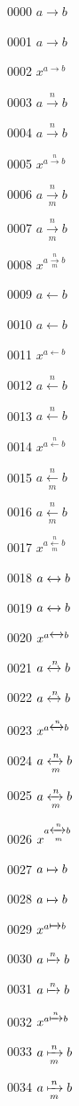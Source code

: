\documentclass{article}
\begin{document}
0000 $a\xrightarrow{}b$\par
0001 $\displaystyle a\xrightarrow{}b$\par
0002 $x^{a\xrightarrow{}b}$\par
0003 $a\xrightarrow{n}b$\par
0004 $\displaystyle a\xrightarrow{n}b$\par
0005 $x^{a\xrightarrow{n}b}$\par
0006 $a\xrightarrow[m]{n}b$\par
0007 $\displaystyle a\xrightarrow[m]{n}b$\par
0008 $x^{a\xrightarrow[m]{n}b}$\par
0009 $a\xleftarrow{}b$\par
0010 $\displaystyle a\xleftarrow{}b$\par
0011 $x^{a\xleftarrow{}b}$\par
0012 $a\xleftarrow{n}b$\par
0013 $\displaystyle a\xleftarrow{n}b$\par
0014 $x^{a\xleftarrow{n}b}$\par
0015 $a\xleftarrow[m]{n}b$\par
0016 $\displaystyle a\xleftarrow[m]{n}b$\par
0017 $x^{a\xleftarrow[m]{n}b}$\par
0018 $a\xleftrightarrow{}b$\par
0019 $\displaystyle a\xleftrightarrow{}b$\par
0020 $x^{a\xleftrightarrow{}b}$\par
0021 $a\xleftrightarrow{n}b$\par
0022 $\displaystyle a\xleftrightarrow{n}b$\par
0023 $x^{a\xleftrightarrow{n}b}$\par
0024 $a\xleftrightarrow[m]{n}b$\par
0025 $\displaystyle a\xleftrightarrow[m]{n}b$\par
0026 $x^{a\xleftrightarrow[m]{n}b}$\par
0027 $a\xmapsto{}b$\par
0028 $\displaystyle a\xmapsto{}b$\par
0029 $x^{a\xmapsto{}b}$\par
0030 $a\xmapsto{n}b$\par
0031 $\displaystyle a\xmapsto{n}b$\par
0032 $x^{a\xmapsto{n}b}$\par
0033 $a\xmapsto[m]{n}b$\par
0034 $\displaystyle a\xmapsto[m]{n}b$\par
\end{document}
